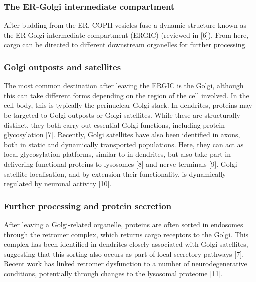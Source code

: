 \documentclass[
  12pt,
  a4paper,
]{article}
\begin{document}
\hypertarget{the-er-golgi-intermediate-compartment}{%
\subsubsection{The ER-Golgi intermediate
compartment}\label{the-er-golgi-intermediate-compartment}}

After budding from the ER, COPII vesicles fuse a dynamic structure known
as the ER-Golgi intermediate compartment (ERGIC) (reviewed in {[}6{]}).
From here, cargo can be directed to different downstream organelles for
further processing.

\hypertarget{golgi-outposts-and-satellites}{%
\subsubsection{Golgi outposts and
satellites}\label{golgi-outposts-and-satellites}}

The most common destination after leaving the ERGIC is the Golgi,
although this can take different forms depending on the region of the
cell involved. In the cell body, this is typically the perinuclear Golgi
stack. In dendrites, proteins may be targeted to Golgi outposts or Golgi
satellites. While these are structurally distinct, they both carry out
essential Golgi functions, including protein glycosylation {[}7{]}.
Recently, Golgi satellites have also been identified in axons, both in
static and dynamically transported populations. Here, they can act as
local glycosylation platforms, similar to in dendrites, but also take
part in delivering functional proteins to lysosomes {[}8{]} and nerve
terminals {[}9{]}. Golgi satellite localisation, and by extension their
functionality, is dynamically regulated by neuronal activity {[}10{]}.

\hypertarget{further-processing-and-protein-secretion}{%
\subsubsection{Further processing and protein
secretion}\label{further-processing-and-protein-secretion}}

After leaving a Golgi-related organelle, proteins are often sorted in
endosomes through the retromer complex, which returns cargo receptors to
the Golgi. This complex has been identified in dendrites closely
associated with Golgi satellites, suggesting that this sorting also
occurs as part of local secretory pathways {[}7{]}. Recent work has
linked retromer dysfunction to a number of neurodegenerative conditions,
potentially through changes to the lysosomal proteome {[}11{]}.
\end{document}
